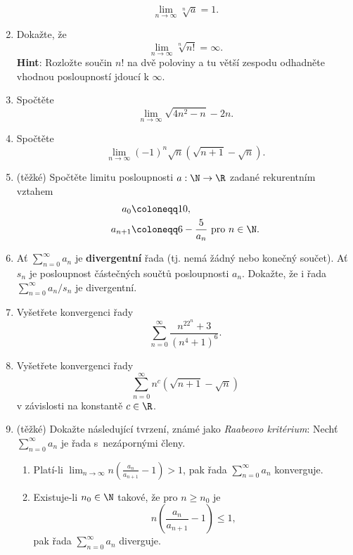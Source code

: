 \begin{enumerate}
  \[
   \lim_{n \to \infty} \sqrt[n]{a} = 1.
  \]
 \item Dokažte, že
  \[
   \lim_{n \to \infty} \sqrt[n]{n!} = \infty.
  \]
  \textbf{Hint}: Rozložte součin $n!$ na dvě poloviny a tu větší zespodu
  odhadněte vhodnou posloupností jdoucí k $\infty$.
 \item Spočtěte
  \[
   \lim_{n \to \infty} \sqrt{4n^2 - n} - 2n.
  \]
 \item Spočtěte
  \[
   \lim_{n \to \infty} (-1)^{n}\sqrt{n}(\sqrt{n+1}-\sqrt{n}).
  \]
 \item (těžké) Spočtěte limitu posloupnosti $a:\N \to \R$ zadané rekurentním
  vztahem
  \begin{align*}
   a_0 &\coloneqq 10,\\
   a_{n+1} & \coloneqq 6 - \frac{5}{a_n} \text{ pro } n \in \N.
  \end{align*}
 \item Ať $\sum_{n = 0}^{\infty} a_n$ je \textbf{divergentní} řada (tj. nemá
  žádný nebo konečný součet). Ať $s_n$ je posloupnost částečných součtů
  posloupnosti $a_n$. Dokažte, že i řada $\sum_{n = 0}^{\infty} a_n / s_n$ je
  divergentní.
 \item Vyšetřete konvergenci řady
  \[
   \sum_{n=0}^{\infty} \frac{n^22^{n}+3}{(n^{4}+1)^{6}}.
  \]
 \item Vyšetřete konvergenci řady
  \[
   \sum_{n = 0}^{\infty} n^{c}(\sqrt{n+1}-\sqrt{n})
  \]
  v závislosti na konstantě $c \in \R$.
 \item (těžké) Dokažte následující tvrzení, známé jako \emph{Raabeovo
  kritérium}: Nechť $\sum_{n = 0}^{\infty} a_n$ je řada s~nezápornými členy.
  \begin{enumerate}[label=(\alph*)]
   \item Platí-li $\lim_{n \to \infty} n \left( \frac{a_n}{a_{n+1}} - 1 \right) >
    1$, pak řada $\sum_{n = 0}^{\infty} a_n$ konverguje.
   \item Existuje-li $n_0 \in \N$ takové, že pro $n \geq n_0$ je
   \[
    n \left( \frac{a_n}{a_{n+1}} - 1 \right) \leq 1,
   \]
   pak řada $\sum_{n = 0}^{\infty} a_n$ diverguje.
  \end{enumerate}
\end{enumerate}

\section*{}

